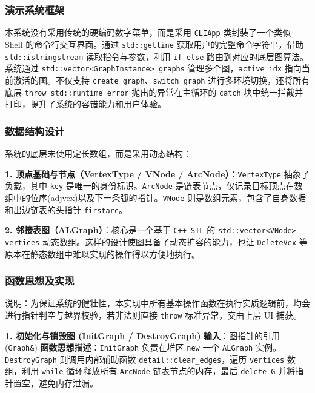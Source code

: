 \documentclass[supercite]{Experimental_Report}
\theoremstyle{definition}
\begin{document}
\subsubsection{演示系统框架}
本系统没有采用传统的硬编码数字菜单，而是采用 \texttt{CLIApp} 类封装了一个类似 Shell 的命令行交互界面。通过 \texttt{std::getline} 获取用户的完整命令字符串，借助 \texttt{std::istringstream} 读取指令与参数，利用 \texttt{if-else} 路由到对应的底层图算法。
系统通过 \texttt{std::vector<GraphInstance> graphs} 管理多个图，\texttt{active\_idx} 指向当前激活的图。不仅支持 \texttt{create\_graph}、\texttt{switch\_graph} 进行多环境切换，还将所有底层 \texttt{throw std::runtime\_error} 抛出的异常在主循环的 \texttt{catch} 块中统一拦截并打印，提升了系统的容错能力和用户体验。

\subsubsection{数据结构设计}
系统的底层未使用定长数组，而是采用动态结构：

\textbf{1. 顶点基础与节点（VertexType / VNode / ArcNode）}：\texttt{VertexType} 抽象了负载，其中 \texttt{key} 是唯一的身份标识。\texttt{ArcNode} 是链表节点，仅记录目标顶点在数组中的位序(adjvex)以及下一条弧的指针。\texttt{VNode} 则是数组元素，包含了自身数据和出边链表的头指针 \texttt{firstarc}。

\textbf{2. 邻接表图（ALGraph）}：核心是一个基于 \texttt{C++ STL} 的 \texttt{std::vector<VNode> vertices} 动态数组。这样的设计使图具备了动态扩容的能力，也让 \texttt{DeleteVex} 等原本在静态数组中难以实现的操作得以方便地执行。

\subsubsection{函数思想及实现}
说明：为保证系统的健壮性，本实现中所有基本操作函数在执行实质逻辑前，均会进行指针判空与越界校验，若非法则直接 \texttt{throw} 标准异常，交由上层 UI 捕获。

\vspace{0.5em}
\noindent\textbf{1. 初始化与销毁图 (InitGraph / DestroyGraph)}
\newline\textbf{输入}：图指针的引用 (\texttt{Graph\&})
\newline\textbf{函数思想描述}：\texttt{InitGraph} 负责在堆区 \texttt{new} 一个 \texttt{ALGraph} 实例。\texttt{DestroyGraph} 则调用内部辅助函数 \texttt{detail::clear\_edges}，遍历 \texttt{vertices} 数组，利用 \texttt{while} 循环释放所有 \texttt{ArcNode} 链表节点的内存，最后 \texttt{delete G} 并将指针置空，避免内存泄漏。
\end{document}
